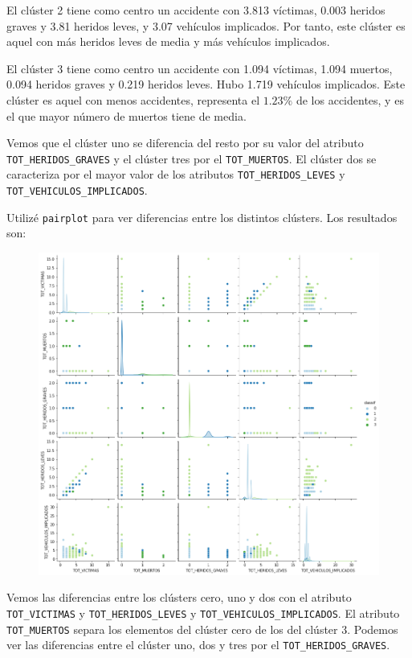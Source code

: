 \documentclass[a4]{article}
\begin{document}
El clúster 2 tiene como centro un accidente con 3.813 víctimas, 0.003 heridos graves y 3.81 heridos leves, y 3.07 vehículos implicados. Por tanto, este clúster es aquel con más heridos leves de media y más vehículos implicados.

El clúster 3 tiene como centro un accidente con 1.094 víctimas, 1.094 muertos, 0.094 heridos graves y 0.219 heridos leves. Hubo 1.719 vehículos implicados. Este clúster es aquel con menos accidentes, representa el $1.23\%$ de los accidentes, y es el que mayor número de muertos tiene de media.

Vemos que el clúster uno se diferencia del resto por su valor del atributo \texttt{TOT\_HERIDOS\_GRAVES} y el clúster tres por el \texttt{TOT\_MUERTOS}. El clúster dos se caracteriza por el mayor valor de los atributos \texttt{TOT\_HERIDOS\_LEVES} y \\\texttt{TOT\_VEHICULOS\_IMPLICADOS}.

Utilizé \texttt{pairplot} para ver diferencias entre los distintos clústers. Los resultados son:

\begin{figure}[H]
  \centering
  \includegraphics[width=170mm]{imagenes/c3_kmeans_pairplot}
\end{figure}

Vemos las diferencias entre los clústers cero, uno y dos con el atributo \texttt{TOT\_VICTIMAS} y \texttt{TOT\_HERIDOS\_LEVES} y \texttt{TOT\_VEHICULOS\_IMPLICADOS}. El atributo \texttt{TOT\_MUERTOS} separa los elementos del clúster cero de los del clúster 3. Podemos ver las diferencias entre el clúster uno, dos y tres por el \texttt{TOT\_HERIDOS\_GRAVES}.
\end{document}
